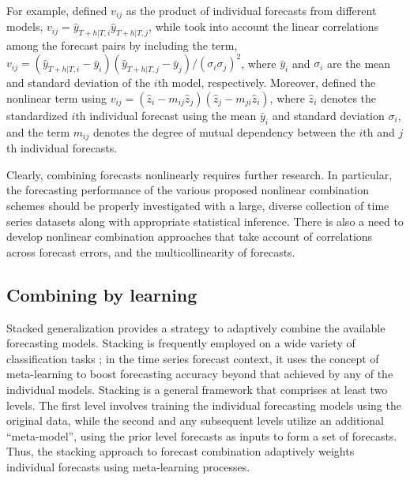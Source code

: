 \documentclass[a4paper,11pt]{article}
\begin{document}
For example, \citet{Freitas2006-fn} defined $v_{i j}$ as the product of individual forecasts from different models, $v_{ij} = \hat{y}_{T+h|T, i} \hat{y}_{T+h|T, j}$, while \citet{Adhikari2012-ur} took into account the linear correlations among the forecast pairs by including the term, $v_{ij} = (\hat{y}_{T+h|T, i}-\bar{y}_{i})(\hat{y}_{T+h|T, j}-\bar{y}_{j})/(\sigma_{i}\sigma_{j})^2$, where $\bar{y}_{i}$ and $\sigma_{i}$ are the mean and standard deviation of the $i$th model, respectively. Moreover, \citet{Adhikari2015-bb} defined the nonlinear term using $v_{ij} = \left(\hat{z}_{i}-m_{i j} \hat{z}_{j}\right)\left(\hat{z}_{j}-m_{j i} \hat{z}_{i}\right)$, where $\hat{z}_{i}$ denotes the standardized $i$th individual forecast using the mean $\bar{y}_{i}$ and standard deviation $\sigma_{i}$, and the term $m_{i j}$ denotes the degree of mutual dependency between the $i$th and $j$th individual forecasts.

Clearly, combining forecasts nonlinearly requires further research. In particular, the forecasting performance of the various proposed nonlinear combination schemes should be properly investigated with a large, diverse collection of time series datasets along with appropriate statistical inference. There is also a need to develop nonlinear combination approaches that take account of correlations across forecast errors, and the multicollinearity of forecasts.

\subsection{Combining by learning}
\label{sec:comb_learn}

Stacked generalization \citep[stacking,][]{Wolpert1992-if} provides a strategy to adaptively combine the available forecasting models. Stacking is frequently employed on a wide variety of classification tasks \citep{Zhou2012-cy}; in the time series forecast context, it uses the concept of meta-learning to boost forecasting accuracy beyond that achieved by any of the individual models. Stacking is a general framework that comprises at least two levels. The first level involves training the individual forecasting models using the original data, while the second and any subsequent levels utilize an additional ``meta-model'', using the prior level forecasts as inputs to form a set of forecasts. Thus, the stacking approach to forecast combination adaptively weights individual forecasts using meta-learning processes.
\end{document}

